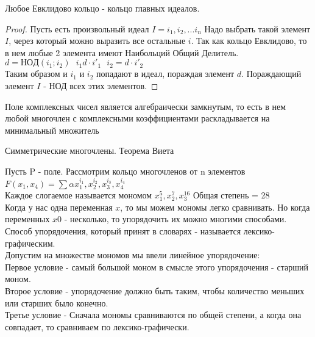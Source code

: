 \begin{theorem}
	Любое Евклидово кольцо - кольцо главных идеалов.
\end{theorem}

\begin{proof}
	Пусть есть произвольный идеал $I = {i_1, i_2, ... i_n}$ Надо выбрать такой
	элемент $I$, через который можно выразить все остальные $i$. Так как кольцо
	Евклидово, то в нем любые 2 элемента имеют Наибольций Общий Делитель.\\
	$d = НОД(i_1; i_2) ~~~ i_1 d \cdot i'_1 ~~~ i_2 = d \cdot i'_2$\\
	Таким образом и $i_1$ и $i_2$ попадают в идеал, пораждая элемент $d$.
	Пораждающий элемент $I$ - НОД всех этих элементов.
\end{proof}

\begin{theorem}
	Поле комплексных чисел является алгебраически замкнутым, то есть в нем любой
	многочлен с комплексными коэффициентами раскладывается на минимальный
	множитель
\end{theorem}

\begin{title}
	Симметрические многочлены. Теорема Виета
\end{title}

Пусть P - поле. Рассмотрим кольцо многочленов от n элементов\\
$F(x_1, x_4) = \sum \alpha x^{i_1}_1, x^{i_2}_2, x^{i_3}_3, x^{i_4}_4$\\
Каждое слогаемое называется мономом $x^{5}_1, x^{7}_2, x^{16}_3$
Общая степень = 28\\
Когда у нас одна переменная $x$, то мы можем мономы легко сравнивать. Но когда
переменных $x0$ - несколько, то упорядочить их можно многими способами.\\
Способ упорядочения, который принят в словарях - называется
лексико-графическим.\\
Допустим на множестве мономов мы ввели линейное упорядочение:\\
Первое условие - самый большой моном в смысле этого упорядочения - старший
моном.\\
Второе условие - упорядочение должно быть таким, чтобы количество меньших или
старших было конечно.\\
Третье условие - Сначала мономы сравниваются по общей степени, а когда она
совпадает, то сравниваем по лексико-графически.\\


